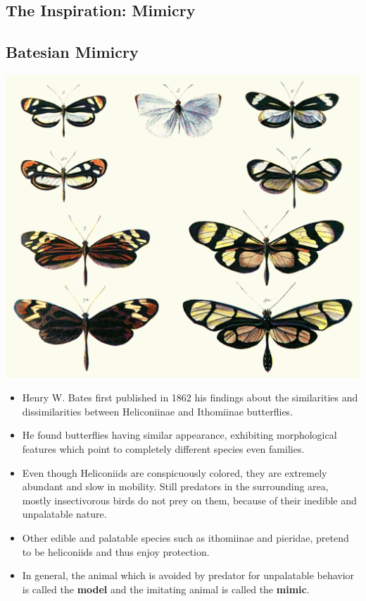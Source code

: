 \documentclass[a0,landscape]{a0poster}
\begin{document}
\begin{multicols}{5}

\color{SaddleBrown} 


\section*{The Inspiration: Mimicry}
\subsection*{Batesian Mimicry}

\begin{center}\vspace{1cm}
\includegraphics[width=0.5\linewidth]{Batesplate_ArM.png}
\end{center}\vspace{1cm}

\begin{itemize}
	\item Henry W. Bates first published in 1862 his findings about the similarities and dissimilarities between Heliconiinae and Ithomiinae butterflies.
	\item He found butterflies having similar appearance, exhibiting morphological features which point to completely different species even families.
	\item Even though Heliconiids are conspicuously colored, they are extremely abundant and slow in mobility. Still predators in the surrounding area, mostly insectivorous birds do not prey on them, because of their inedible and unpalatable nature.
	\item Other edible and palatable species such as ithomiinae and pieridae, pretend to be heliconiids and thus enjoy protection.
	\item In general, the animal which is avoided by predator for unpalatable behavior is called the \textbf{model} and the imitating animal is called the \textbf{mimic}.
\end{itemize}


\end{multicols}
\end{document}
